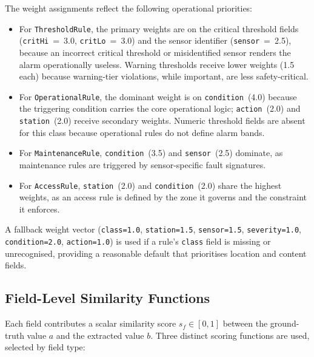 ﻿\documentclass[11pt]{article}
\begin{document}
The weight assignments reflect the following operational priorities:
\begin{itemize}
    \item For \texttt{ThresholdRule}, the primary weights are on the critical
          threshold fields (\texttt{critHi}~=~3.0, \texttt{critLo}~=~3.0) and
          the sensor identifier (\texttt{sensor}~=~2.5), because an incorrect
          critical threshold or misidentified sensor renders the alarm
          operationally useless.
          Warning thresholds receive lower weights (1.5 each) because
          warning-tier violations, while important, are less safety-critical.
    \item For \texttt{OperationalRule}, the dominant weight is on
          \texttt{condition}~(4.0) because the triggering condition carries the
          core operational logic; \texttt{action}~(2.0) and \texttt{station}~(2.0)
          receive secondary weights.
          Numeric threshold fields are absent for this class because operational
          rules do not define alarm bands.
    \item For \texttt{MaintenanceRule}, \texttt{condition}~(3.5) and
          \texttt{sensor}~(2.5) dominate, as maintenance rules are triggered by
          sensor-specific fault signatures.
    \item For \texttt{AccessRule}, \texttt{station}~(2.0) and
          \texttt{condition}~(2.0) share the highest weights, as an access rule
          is defined by the zone it governs and the constraint it enforces.
\end{itemize}

A fallback weight vector (\texttt{class=1.0}, \texttt{station=1.5},
\texttt{sensor=1.5}, \texttt{severity=1.0}, \texttt{condition=2.0},
\texttt{action=1.0}) is used if a rule's \texttt{class} field is missing or
unrecognised, providing a reasonable default that prioritises location and
content fields.

\subsection{Field-Level Similarity Functions}
\label{sec:similarity_funcs}

Each field contributes a scalar similarity score $s_f \in [0,1]$ between the
ground-truth value $a$ and the extracted value $b$.
Three distinct scoring functions are used, selected by field type:
\end{document}

